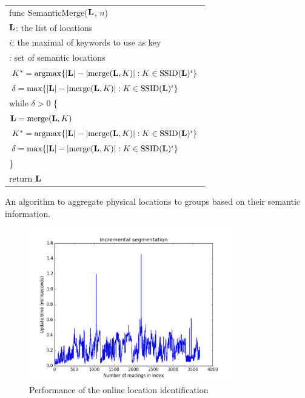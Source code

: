 \begin{algorithm}[h]
    \small
    \begin{tabular}{|l|} \hline
        func SemanticMerge($\mathbf{L}$, $n$) \\ 
        \RRR $\mathbf{L}$: the list of locations \\
        \RRR $i$: the maximal of keywords to use as key \\ 
        \RRR {\em returns}: set of semantic locations \\ \hline
        $K^* = \mathrm{argmax} \{|\mathbf{L}| - |\mathrm{merge}(\mathbf{L}, K)| : K\in\mathrm{SSID}(\mathbf{L})^i\}$ \\
        $\delta = \mathrm{max} \{|\mathbf{L}| - |\mathrm{merge}(\mathbf{L}, K)| : K\in\mathrm{SSID}(\mathbf{L})^i\}$ \\
        while $\delta > 0$ \{ \\
        \RRR $\mathbf{L} = \mathrm{merge}(\mathbf{L}, K)$ \\
        \RRR $K^* = \mathrm{argmax} \{|\mathbf{L}| - |\mathrm{merge}(\mathbf{L}, K)| : K\in\mathrm{SSID}(\mathbf{L})^i\}$ \\
        \RRR $\delta = \mathrm{max} \{|\mathbf{L}| - |\mathrm{merge}(\mathbf{L}, K)| : K\in\mathrm{SSID}(\mathbf{L})^i\}$ \\
        \}\\
        return $\mathbf{L}$ \\ \hline
    \end{tabular}
    \vspace{0.4cm}
    \caption{An algorithm to aggregate physical locations to groups based on
    their semantic information.}
    \label{alg:semantic}
\end{algorithm}

\begin{figure}[t]
    \centering
    \includegraphics[width=3.5in]{../plots/incremental.pdf}
    \caption{Performance of the online location identification}
    \label{fig:incremental}
\end{figure}




